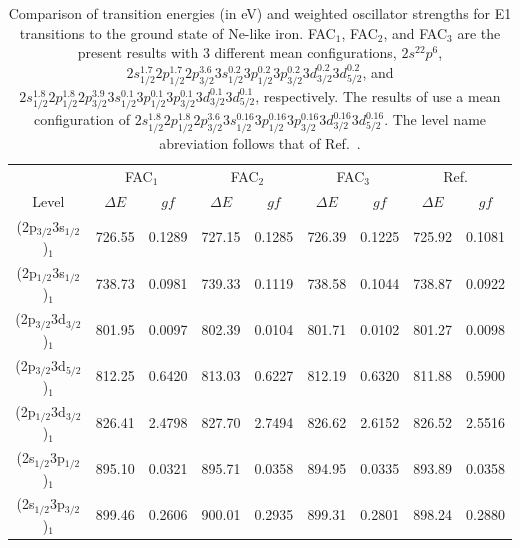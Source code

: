 \documentclass[preprint, floatfix, pra, showpacs, showkeys]{revtex4}
\begin{document}
\begingroup
\squeezetable
\begin{table}
\caption{\label{tab_fe10} Comparison of transition energies (in eV) and
weighted oscillator strengths for E1 transitions to the
ground state of Ne-like iron. FAC$_1$, FAC$_2$, and FAC$_3$ are the present
results with 3 different mean configurations, $2s^22p^6$, $2s_{1/2}^{1.7}
2p_{1/2}^{1.7} 2p_{3/2}^{3.6} 3s_{1/2}^{0.2} 3p_{1/2}^{0.2} 3p_{3/2}^{0.2}
3d_{3/2}^{0.2} 3d_{5/2}^{0.2}$, and $2s_{1/2}^{1.8} 2p_{1/2}^{1.8}
2p_{3/2}^{3.9} 3s_{1/2}^{0.1} 3p_{1/2}^{0.1} 3p_{3/2}^{0.1} 3d_{3/2}^{0.1}
3d_{5/2}^{0.1}$, respectively. The results of \textcite{sampson89} use
a mean configuration of $2s_{1/2}^{1.8} 2p_{1/2}^{1.8}
2p_{3/2}^{3.6} 3s_{1/2}^{0.16} 3p_{1/2}^{0.16} 3p_{3/2}^{0.16} 3d_{3/2}^{0.16}
3d_{5/2}^{0.16}$. The level name abreviation follows that of
Ref.~\cite{sampson89}.} 
\begin{ruledtabular}
\begin{tabular}{c*{8}{c}}
& \multicolumn{2}{c}{FAC$_{1}$}& \multicolumn{2}{c}{FAC$_{2}$}& 
\multicolumn{2}{c}{FAC$_{3}$}& \multicolumn{2}{c}{Ref.~\cite{sampson89}}\\
\cline{2-9}
Level& 
\multicolumn{1}{c}{$\Delta E$}& \multicolumn{1}{c}{$gf$}& 
\multicolumn{1}{c}{$\Delta E$}& \multicolumn{1}{c}{$gf$}& 
\multicolumn{1}{c}{$\Delta E$}& \multicolumn{1}{c}{$gf$}& 
\multicolumn{1}{c}{$\Delta E$}& \multicolumn{1}{c}{$gf$}\\
\hline
(2p$_{3/2}$3s$_{1/2}$)$_{1}$ &726.55 &0.1289 &727.15 &0.1285 &726.39 &0.1225 &725.92 &0.1081 \\
(2p$_{1/2}$3s$_{1/2}$)$_{1}$ &738.73 &0.0981 &739.33 &0.1119 &738.58 &0.1044 &738.87 &0.0922 \\
(2p$_{3/2}$3d$_{3/2}$)$_{1}$ &801.95 &0.0097 &802.39 &0.0104 &801.71 &0.0102 &801.27 &0.0098 \\
(2p$_{3/2}$3d$_{5/2}$)$_{1}$ &812.25 &0.6420 &813.03 &0.6227 &812.19 &0.6320 &811.88 &0.5900 \\
(2p$_{1/2}$3d$_{3/2}$)$_{1}$ &826.41 &2.4798 &827.70 &2.7494 &826.62 &2.6152 &826.52 &2.5516 \\
(2s$_{1/2}$3p$_{1/2}$)$_{1}$ &895.10 &0.0321 &895.71 &0.0358 &894.95 &0.0335 &893.89 &0.0358 \\
(2s$_{1/2}$3p$_{3/2}$)$_{1}$ &899.46 &0.2606 &900.01 &0.2935 &899.31 &0.2801 &898.24 &0.2880 \\
\end{tabular}
\end{ruledtabular}
\end{table}
\endgroup
\end{document}
